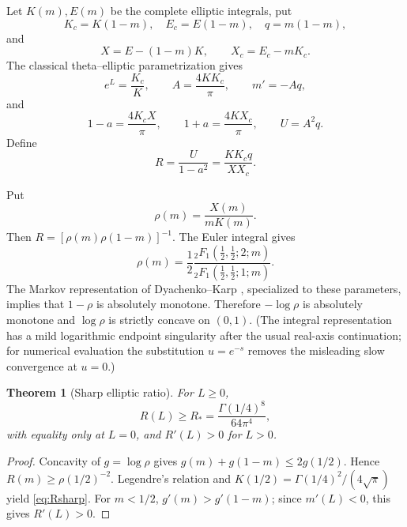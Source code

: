 \documentclass{amsart}
\numberwithin{equation}{section}
\newtheorem{theorem}{Theorem}[section]
\theoremstyle{definition}
\theoremstyle{remark}
\newcommand{\Rstar}{R_*}
\begin{document}
Let $K(m),E(m)$ be the complete elliptic integrals, put
\[
 K_c=K(1-m),\quad E_c=E(1-m),\quad q=m(1-m),
\]
and
\[
 X=E-(1-m)K,\qquad X_c=E_c-mK_c.
\]
The classical theta--elliptic parametrization gives
\begin{equation}\label{eq:ellipticbasic}
 e^L=\frac{K_c}{K},\qquad
 A=\frac{4KK_c}{\pi},\qquad
 m'=-Aq,
\end{equation}
and
\begin{equation}\label{eq:phaseell}
 1-a=\frac{4K_cX}{\pi},\qquad
 1+a=\frac{4KX_c}{\pi},\qquad
 U=A^2q.
\end{equation}
Define
\begin{equation}\label{eq:Rdef}
 R=\frac{U}{1-a^2}
 =\frac{KK_cq}{XX_c}.
\end{equation}

Put
\begin{equation}\label{eq:rhoell}
 \rho(m)=\frac{X(m)}{mK(m)}.
\end{equation}
Then $R=[\rho(m)\rho(1-m)]^{-1}$.  The Euler integral gives
\begin{equation}\label{eq:rhohyp}
 \rho(m)=\frac12
 \frac{{}_2F_1(\frac12,\frac12;2;m)}{{}_2F_1(\frac12,\frac12;1;m)}.
\end{equation}
The Markov representation of Dyachenko--Karp \cite[Example~8]{DyachenkoKarp2022}, specialized to these parameters, implies that $1-\rho$ is absolutely monotone.  Therefore $-\log\rho$ is absolutely monotone and $\log\rho$ is strictly concave on $(0,1)$.  (The integral representation has a mild logarithmic endpoint singularity after the usual real-axis continuation; for numerical evaluation the substitution $u=e^{-s}$ removes the misleading slow convergence at $u=0$.)

\begin{theorem}[Sharp elliptic ratio]\label{thm:Rsharp}
For $L\ge0$,
\begin{equation}\label{eq:Rsharp}
 \boxed{\qquad R(L)\ge\Rstar=\frac{\Gamma(1/4)^8}{64\pi^4},\qquad}
\end{equation}
with equality only at $L=0$, and $R'(L)>0$ for $L>0$.
\end{theorem}
\begin{proof}
Concavity of $g=\log\rho$ gives
$g(m)+g(1-m)\le2g(1/2)$.  Hence $R(m)\ge\rho(1/2)^{-2}$.  Legendre's relation and $K(1/2)=\Gamma(1/4)^2/(4\sqrt\pi)$ yield \eqref{eq:Rsharp}.  For $m<1/2$, $g'(m)>g'(1-m)$; since $m'(L)<0$, this gives $R'(L)>0$.
\end{proof}
\end{document}
